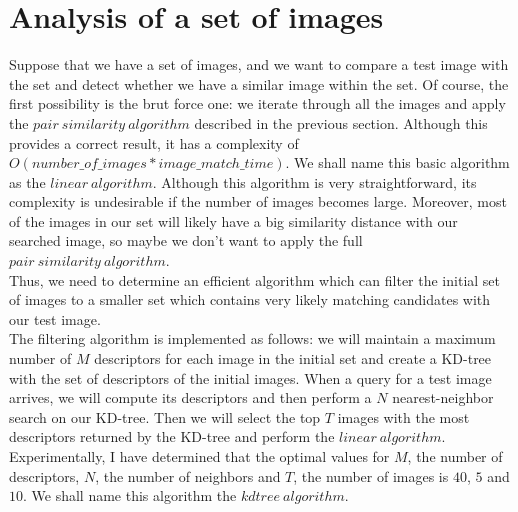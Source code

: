  
\section{Analysis of a set of images}

Suppose that we have a set of images, and we want to compare a test image with the set and detect whether we have a similar image within the set. Of course, the first possibility is the brut force one: we iterate through all the images and apply the $pair\ similarity\ algorithm$ described in the previous section. Although this provides a correct result, it has a complexity of $O(number\_of\_images * image\_match\_time)$. We shall name this basic algorithm as the $linear\ algorithm$. Although this algorithm is very straightforward, its complexity is undesirable if the number of images becomes large. Moreover, most of the images in our set will likely have a big similarity distance with our searched image, so maybe we don't want to apply the full $pair\ similarity\ algorithm$.\\
Thus, we need to determine an efficient algorithm which can filter the initial set of images to a smaller set which contains very likely matching candidates with our test image.\\
The filtering algorithm is implemented as follows: we will maintain a maximum number of $M$ descriptors for each image in the initial set and create a KD-tree with the set of descriptors of the initial images. When a query for a test image arrives, we will compute its descriptors and then perform a $N$ nearest-neighbor search on our KD-tree. Then we will select the top $T$ images with the most descriptors returned by the KD-tree and perform the $linear\ algorithm$. Experimentally, I have determined that the optimal values for $M$, the number of descriptors, $N$, the number of neighbors and $T$, the number of images is $40$, $5$ and $10$. We shall name this algorithm the $kdtree\ algorithm$.
 
 
